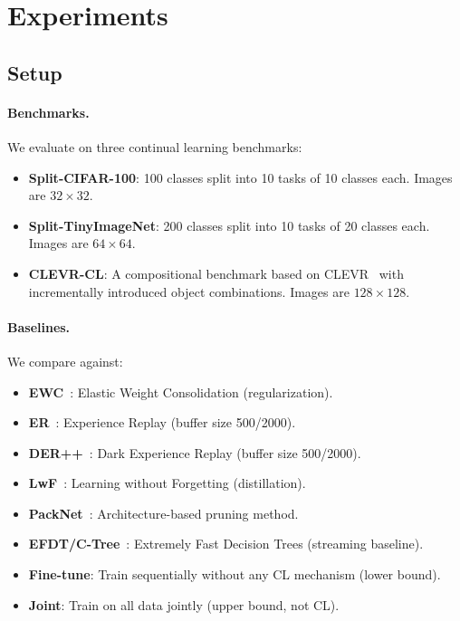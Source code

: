 \documentclass{article}
\begin{document}
\section{Experiments}
\label{sec:experiments}

\subsection{Setup}

\paragraph{Benchmarks.}
We evaluate on three continual learning benchmarks:
\begin{itemize}
    \item \textbf{Split-CIFAR-100}: 100 classes split into 10 tasks of 10 classes each. Images are $32\times32$.
    \item \textbf{Split-TinyImageNet}: 200 classes split into 10 tasks of 20 classes each. Images are $64\times64$.
    \item \textbf{CLEVR-CL}: A compositional benchmark based on CLEVR~\citep{johnson2017clevr} with incrementally introduced object combinations. Images are $128\times128$.
\end{itemize}

\paragraph{Baselines.}
We compare against:
\begin{itemize}
    \item \textbf{EWC}~\citep{kirkpatrick2017overcoming}: Elastic Weight Consolidation (regularization).
    \item \textbf{ER}~\citep{chaudhry2019tiny}: Experience Replay (buffer size 500/2000).
    \item \textbf{DER++}~\citep{buzzega2020dark}: Dark Experience Replay (buffer size 500/2000).
    \item \textbf{LwF}~\citep{li2017learning}: Learning without Forgetting (distillation).
    \item \textbf{PackNet}~\citep{mallya2018packnet}: Architecture-based pruning method.
    \item \textbf{EFDT/C-Tree}~\citep{manapragada2018extremely}: Extremely Fast Decision Trees (streaming baseline).
    \item \textbf{Fine-tune}: Train sequentially without any CL mechanism (lower bound).
    \item \textbf{Joint}: Train on all data jointly (upper bound, not CL).
\end{itemize}
\end{document}
